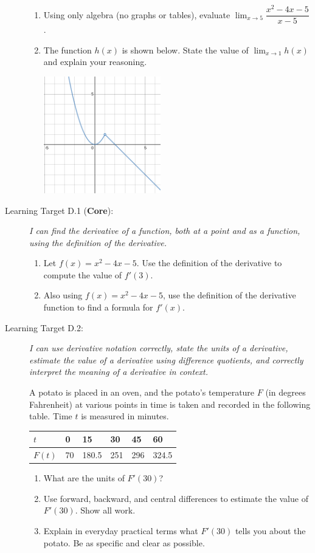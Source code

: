 \documentclass[11 pt]{article}
\begin{document}
\begin{description}
\begin{enumerate}
    \item Using only algebra (no graphs or tables), evaluate $\lim_{x \to 5}\dfrac{x^2 - 4x - 5}{x-5} $.
    \item The function $h(x)$ is shown below. State the value of $\lim_{x \to 1} h(x)$ and explain your reasoning.
    \begin{center}
        \includegraphics[width=2in]{c2p2-sample-l1.png}
    \end{center}
    
\end{enumerate}

\item[Learning Target D.1 (\textbf{Core}):] \textit{I can find the derivative of a function, both at a point and as a function, using the definition of the derivative.}


\begin{enumerate}
    \item Let $f(x) = x^2 - 4x - 5$. Use the definition of the derivative to compute the value of $f'(3)$. 
    \item Also using $f(x) = x^2 - 4x - 5$, use the definition of the derivative function to find a formula for $f'(x)$. 
\end{enumerate}

\item[Learning Target D.2: ] \textit{I can use derivative notation correctly, state the units of a derivative, estimate the value of a derivative using difference quotients, and correctly interpret the meaning of a derivative in context. }

A potato is placed in an oven, and the potato's temperature $F$ (in degrees Fahrenheit) at various points in time is taken and recorded in the following table. Time $t$ is measured in minutes. 

\begin{tabular}{l|l|l|l|l|l}
    $t$ & 0 & 15 & 30 & 45 & 60 \\ \hline
    $F(t)$ & 70 & 180.5 & 251 & 296 & 324.5 
\end{tabular}


\begin{enumerate}
    \item What are the units of $F'(30)$? 
    \item Use forward, backward, and central differences to estimate the value of $F'(30)$. Show all work. 
    \item Explain in everyday practical terms what $F'(30)$ tells you about the potato. Be as specific and clear as possible. 
\end{enumerate}

\end{description}
\end{document}
